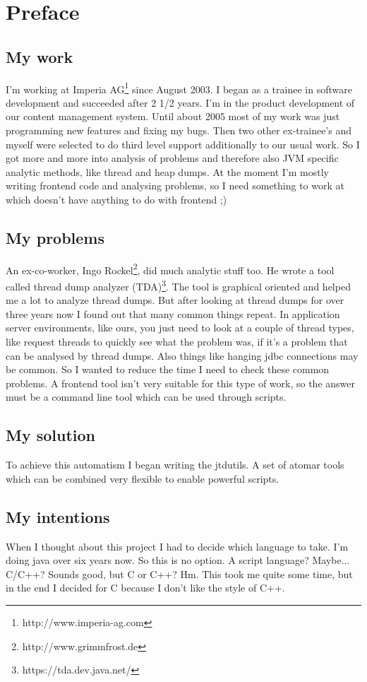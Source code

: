 \section{Preface}

\subsection{My work}

I'm working at Imperia AG\footnote{http://www.imperia-ag.com} since August 2003.
I began as a trainee in software development and succeeded after 2 1/2 years.
I'm in the product development of our content management system.
Until about 2005 most of my work was just programming new features and fixing my bugs.
Then two other ex-trainee's and myself were selected to do third level support additionally to our usual work.
So I got more and more into analysis of problems and therefore also JVM specific analytic methods, like thread and heap dumps.
At the moment I'm mostly writing frontend code and analysing problems, so I need something to work at which doesn't have anything to do with frontend ;)

\subsection{My problems}

An ex-co-worker, Ingo Rockel\footnote{http://www.grimmfrost.de}, did much analytic stuff too.
He wrote a tool called thread dump analyzer (TDA)\footnote{https://tda.dev.java.net/}.
The tool is graphical oriented and helped me a lot to analyze thread dumps.
But after looking at thread dumps for over three years now I found out that many common things repeat.
In application server environments, like ours, you just need to look at a couple of thread types, like request threads to quickly see what the problem was, if it's a problem that can be analysed by thread dumps.
Also things like hanging jdbc connections may be common.
So I wanted to reduce the time I need to check these common problems.
A frontend tool isn't very suitable for this type of work, so the answer must be a command line tool which can be used through scripts.

\subsection{My solution}

To achieve this automatism I began writing the jtdutils.
A set of atomar tools which can be combined very flexible to enable powerful scripts.

\subsection{My intentions}

When I thought about this project I had to decide which language to take.
I'm doing java over six years now. 
So this is no option.
A script language?
Maybe...
C/C++?
Sounds good, but C or C++? Hm. This took me quite some time, but in the end I decided for C because I don't like the style of C++.
